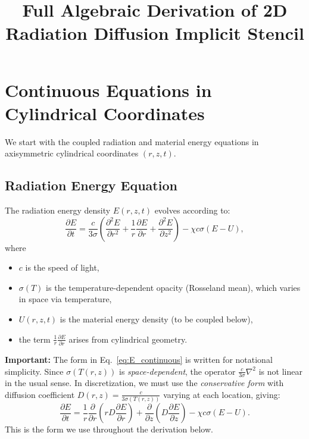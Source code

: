 \documentclass[12pt,oneside]{article}
\title{Full Algebraic Derivation of 2D Radiation Diffusion Implicit Stencil}
\author{}
\date{}
\begin{document}
\maketitle

\tableofcontents
\newpage

\section{Continuous Equations in Cylindrical Coordinates}

We start with the coupled radiation and material energy equations in axisymmetric cylindrical coordinates $(r, z, t)$.

\subsection{Radiation Energy Equation}

The radiation energy density $E(r,z,t)$ evolves according to:
\begin{equation}
\frac{\partial E}{\partial t}
=
\frac{c}{3\sigma}\left(\frac{\partial^2 E}{\partial r^2} + \frac{1}{r}\frac{\partial E}{\partial r} + \frac{\partial^2 E}{\partial z^2}\right)
-
\chi c\sigma(E - U),
\label{eq:E_continuous}
\end{equation}
where
\begin{itemize}
\item $c$ is the speed of light,
\item $\sigma(T)$ is the temperature-dependent opacity (Rosseland mean), which varies in space via temperature,
\item $U(r,z,t)$ is the material energy density (to be coupled below),
\item the term $\frac{1}{r}\frac{\partial E}{\partial r}$ arises from cylindrical geometry.
\end{itemize}

\textbf{Important:} The form in Eq.~\eqref{eq:E_continuous} is written for notational simplicity. Since $\sigma(T(r,z))$ is \emph{space-dependent}, the operator $\frac{c}{3\sigma}\nabla^2$ is not linear in the usual sense. In discretization, we must use the \emph{conservative form} with diffusion coefficient $D(r,z) = \frac{c}{3\sigma(T(r,z))}$ varying at each location, giving:
\begin{equation}
\frac{\partial E}{\partial t}
=
\frac{1}{r}\frac{\partial}{\partial r}\left(rD\frac{\partial E}{\partial r}\right) + \frac{\partial}{\partial z}\left(D\frac{\partial E}{\partial z}\right)
-
\chi c\sigma(E - U).
\label{eq:E_continuous_conservative}
\end{equation}
This is the form we use throughout the derivation below.
\end{document}
